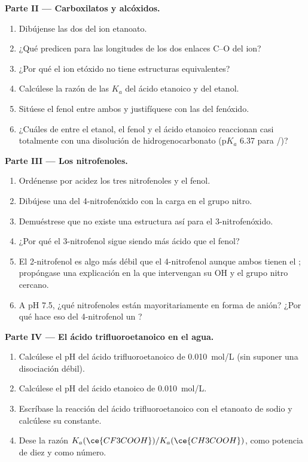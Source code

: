 \begin{problem}
\medskip
\noindent\textbf{Parte II --- Carboxilatos y alcóxidos.}
\begin{enumerate}[resume]
  \item Dibújense las dos  del ion etanoato.
  \item ¿Qué predicen para las longitudes de los dos enlaces C--O del ion?
  \item ¿Por qué el ion etóxido no tiene estructuras equivalentes?
  \item Calcúlese la razón de las $K_a$ del ácido etanoico y del etanol.
  \item Sitúese el fenol entre ambos y justifíquese con las  del fenóxido.
  \item ¿Cuáles de entre el etanol, el fenol y el ácido etanoico reaccionan
        casi totalmente con una disolución de hidrogenocarbonato
        ($\mathrm{p}K_a$ 6.37 para
        /)?
\end{enumerate}

\medskip
\noindent\textbf{Parte III --- Los nitrofenoles.}
\begin{enumerate}[resume]
  \item Ordénense por acidez los tres nitrofenoles y el fenol.
  \item Dibújese una  del 4-nitrofenóxido con la carga en
        el grupo nitro.
  \item Demuéstrese que no existe una estructura así para el
        3-nitrofenóxido.
  \item ¿Por qué el 3-nitrofenol sigue siendo más ácido que el fenol?
  \item El 2-nitrofenol es algo más débil que el 4-nitrofenol aunque ambos
        tienen el ; propóngase una explicación en la que
        intervengan su OH y el grupo nitro cercano.
  \item A pH 7.5, ¿qué nitrofenoles están mayoritariamente en forma de
        anión? ¿Por qué hace eso del 4-nitrofenol un ?
\end{enumerate}

\medskip
\noindent\textbf{Parte IV --- El ácido trifluoroetanoico en el agua.}
\begin{enumerate}[resume]
  \item Calcúlese el pH del ácido trifluoroetanoico de \qty{0.010}{mol/L}
        (sin suponer una disociación débil).
  \item Calcúlese el pH del ácido etanoico de \qty{0.010}{mol/L}.
  \item Escríbase la reacción del ácido trifluoroetanoico con el etanoato
        de sodio y calcúlese su constante.
  \item Dese la razón $K_a(\ce{CF3COOH})/K_a(\ce{CH3COOH})$, como potencia
        de diez y como número.
\end{enumerate}
\end{problem}
